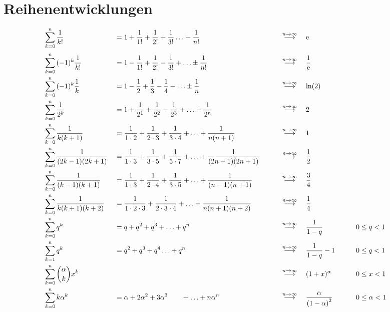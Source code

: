 \section{Reihenentwicklungen}
\begin{alignat}{4}
&\sum\limits_{k=0}^{n}{\frac{1}{k!}}&&= 1+\frac{1}{1!}+\frac{1}{2!}+\frac{1}{3!}\ldots+\frac{1}{n!} \quad&&\overset{n\rightarrow\infty}{\longrightarrow}\quad \operatorname{\mathrm e}\nonumber\\[0.1cm]
&\sum\limits_{k=0}^{n}{(-1)^{k}\frac{1}{k!}}&&= 1-\frac{1}{1!}+\frac{1}{2!}-\frac{1}{3!}+\ldots\pm\frac{1}{n!}\qquad&&\overset{n\rightarrow\infty}{\longrightarrow}\quad  \frac1{\operatorname{\mathrm e}}\nonumber\\[0.0cm]
&\sum\limits_{k=0}^{n}{(-1)^{k}\frac{1}{k}}&&= 1-\frac{1}{2}+\frac{1}{3}-\frac{1}{4}+\ldots\pm\frac{1}{n}\qquad&&\overset{n\rightarrow\infty}{\longrightarrow}\quad \ln (2)\nonumber\\[0.0cm]
&\sum\limits_{k=0}^{n}{\frac{1}{2^k}}&&= 1+\frac{1}{2^1}+\frac{1}{2^2}-\frac{1}{2^3}+\ldots+\frac{1}{2^n}\qquad&&\overset{n\rightarrow\infty}{\longrightarrow}\quad 2\nonumber\\[0.0cm]
&\sum\limits_{k=0}^{n}{\frac{1}{k(k+1)}}&&= \frac{1}{1\cdot2}+\frac{1}{2\cdot3}+\frac{1}{3\cdot4}+\ldots+\frac{1}{n(n+1)}\qquad&&\overset{n\rightarrow\infty}{\longrightarrow}\quad 1\nonumber\\[0.0cm]
&\sum\limits_{k=0}^{n}{\frac{1}{(2k-1)(2k+1)}}&&= \frac{1}{1\cdot3}+\frac{1}{3\cdot5}+\frac{1}{5\cdot7}+\ldots+\frac{1}{(2n-1)(2n+1)}\qquad&&\overset{n\rightarrow\infty}{\longrightarrow}\quad \frac 12\nonumber\\[0.0cm]
&\sum\limits_{k=0}^{n}{\frac{1}{(k-1)(k+1)}}&&= \frac{1}{1\cdot3}+\frac{1}{2\cdot4}+\frac{1}{3\cdot5}+\ldots+\frac{1}{(n-1)(n+1)}\qquad&&\overset{n\rightarrow\infty}{\longrightarrow}\quad \frac 34\nonumber\\[0.0cm]
&\sum\limits_{k=0}^{n}{\frac{1}{k(k+1)(k+2)}}&&= \frac{1}{1\cdot2\cdot3}+\frac{1}{2\cdot3\cdot4}+\ldots+\frac{1}{n(n+1)(n+2)}\qquad&&\overset{n\rightarrow\infty}{\longrightarrow}\quad \frac 14\nonumber\\[0.0cm]
&\sum\limits_{k=0}^{n}{q^k}&&= q+q^2+q^3+\ldots+q^n\qquad&&\overset{n\rightarrow\infty}{\longrightarrow}\quad \frac{1}{1-q}\qquad&& 0\leq q<1\nonumber\\[0.0cm]
&\sum\limits_{k=1}^{n}{q^k}&&= q^2+q^3+q^4\ldots+q^n\qquad&&\overset{n\rightarrow\infty}{\longrightarrow}\quad  \frac{1}{1-q}-1\qquad&& 0\leq q<1\nonumber\\[0.0cm]
&\sum\limits_{k=0}^{n}{\binom{\alpha}{k}x^k}&&\qquad&&\overset{n\rightarrow\infty}{\longrightarrow}\quad  (1+x)^\alpha\qquad&& 0\leq x<1\nonumber\\
&\sum\limits_{k=0}^{n}{k\alpha^k}&&=\alpha+ 2\alpha^2+3\alpha^3\qquad+\ldots+n\alpha^n&&\overset{n\rightarrow\infty}{\longrightarrow}\quad  \frac{\alpha}{\left(1-\alpha\right)^2}\qquad&& 0\leq \alpha<1\nonumber
\end{alignat}

\vfill
